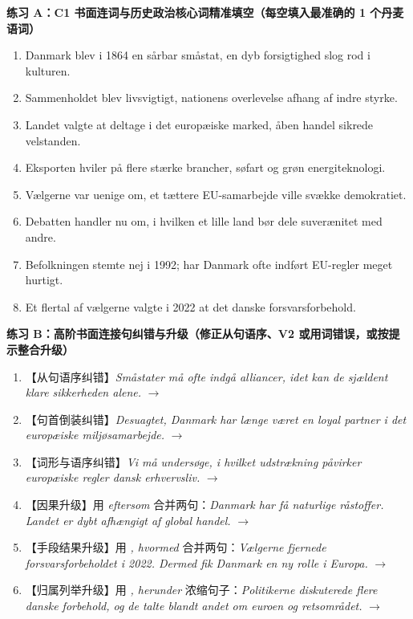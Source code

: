 
\textbf{练习 A：C1 书面连词与历史政治核心词精准填空（每空填入最准确的 1 个丹麦语词）}
\begin{enumerate}
  \item Danmark blev i 1864 en sårbar småstat, \underline{\hspace{2.2cm}} en dyb forsigtighed slog rod i kulturen.
  \item Sammenholdet blev livsvigtigt, \underline{\hspace{2.2cm}} nationens overlevelse afhang af indre styrke.
  \item Landet valgte at deltage i det europæiske marked, \underline{\hspace{2.2cm}} åben handel sikrede velstanden.
  \item Eksporten hviler på flere stærke brancher, \underline{\hspace{2.2cm}} søfart og grøn energiteknologi.
  \item Vælgerne var uenige om, \underline{\hspace{2.2cm}} et tættere EU-samarbejde ville svække demokratiet.
  \item Debatten handler nu om, i hvilken \underline{\hspace{2.2cm}} et lille land bør dele suverænitet med andre.
  \item Befolkningen stemte nej i 1992; \underline{\hspace{2.2cm}} har Danmark ofte indført EU-regler meget hurtigt.
  \item Et flertal af vælgerne valgte i 2022 at \underline{\hspace{2.2cm}} det danske forsvarsforbehold.
\end{enumerate}

\newpage
\textbf{练习 B：高阶书面连接句纠错与升级（修正从句语序、V2 或用词错误，或按提示整合升级）}
\begin{enumerate}
  \item 【从句语序纠错】\textit{Småstater må ofte indgå alliancer, idet kan de sjældent klare sikkerheden alene.} $\rightarrow$
  \item 【句首倒装纠错】\textit{Desuagtet, Danmark har længe været en loyal partner i det europæiske miljøsamarbejde.} $\rightarrow$
  \item 【词形与语序纠错】\textit{Vi må undersøge, i hvilket udstrækning påvirker europæiske regler dansk erhvervsliv.} $\rightarrow$
  \item 【因果升级】用 \textit{eftersom} 合并两句：\textit{Danmark har få naturlige råstoffer. Landet er dybt afhængigt af global handel.} $\rightarrow$
  \item 【手段结果升级】用 \textit{, hvormed} 合并两句：\textit{Vælgerne fjernede forsvarsforbeholdet i 2022. Dermed fik Danmark en ny rolle i Europa.} $\rightarrow$
  \item 【归属列举升级】用 \textit{, herunder} 浓缩句子：\textit{Politikerne diskuterede flere danske forbehold, og de talte blandt andet om euroen og retsområdet.} $\rightarrow$
\end{enumerate}

